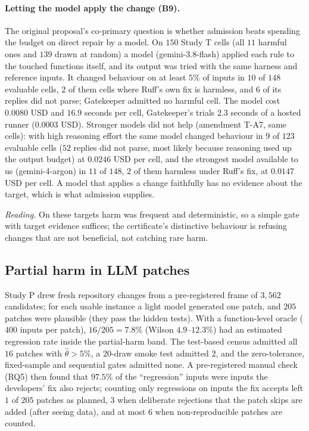 \paragraph{Letting the model apply the change (B9).}
The original proposal's co-primary question is whether admission beats spending the budget on direct repair by a model.  On $150$
Study T cells (all $11$ harmful ones and $139$ drawn at random) a model (gemini-3.8-flash) applied each rule to the touched functions
itself, and its output was tried with the same harness and reference inputs.  It changed behaviour on at least $5\%$ of inputs in
$10$ of $148$ evaluable cells, $2$ of them cells where Ruff's own fix is harmless, and $6$ of its replies did not parse; Gatekeeper
admitted no harmful cell.  The model cost $0.0080$ USD and $16.9$ seconds per cell, Gatekeeper's trials $2.3$ seconds of a hosted
runner ($0.0003$ USD).  Stronger models did not help (amendment T-A7, same cells): with high reasoning effort the same model changed
behaviour in $9$ of $123$ evaluable cells ($52$ replies did not parse, most likely because reasoning used up the output budget) at
$0.0246$ USD per cell, and the strongest model available to us (gemini-4-argon) in $11$ of $148$, $2$ of them harmless under Ruff's
fix, at $0.0147$ USD per cell.  A model that applies a change faithfully has no evidence about the target, which is what admission
supplies.

\emph{Reading.} On these targets harm was frequent and deterministic, so a simple gate with target evidence suffices; the
certificate's distinctive behaviour is refusing changes that are not beneficial, not catching rare harm.

\subsection{Partial harm in LLM patches}
\label{sec:eval-patches}
Study P drew fresh repository changes from a pre-registered frame of $3{,}562$ candidates; for each usable instance a light
model generated one patch, and $205$ patches were plausible (they pass the hidden tests).  With a function-level oracle ($400$ inputs per patch), $16/205=7.8\%$ (Wilson $4.9$--$12.3\%$) had an
estimated regression rate inside the partial-harm band.  The test-based census admitted all $16$ patches with $\hat\theta>5\%$, a
$20$-draw smoke test admitted $2$, and the zero-tolerance, fixed-sample and sequential gates admitted none.  A pre-registered manual
check (RQ5) then found that $97.5\%$ of the ``regression'' inputs were inputs the developers' fix also rejects; counting only
regressions on inputs the fix accepts left $1$ of $205$ patches as planned, $3$ when deliberate rejections that the patch skips are
added (after seeing data), and at most $6$ when non-reproducible patches are counted.

